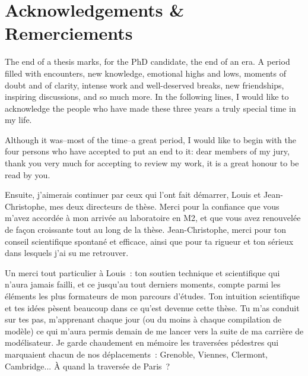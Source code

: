 \newpage
\thispagestyle{empty}
\mbox{}
\newpage


\chapter*{Acknowledgements \& Remerciements}
\label{chap:remerciements}
 {}

{\fontsize{11}{13}\selectfont
The end of a thesis marks, for the PhD candidate, the end of an era.
A period filled with encounters, new knowledge, emotional highs and lows, moments of doubt and of clarity, intense work and well-deserved breaks, new friendships, inspiring discussions, and so much more.
In the following lines, I would like to acknowledge the people who have made these three years a truly special time in my life.
\vspace{1em}

Although it was\---most of the time\---a great period, I would like to begin with the four persons who have accepted to put an end to it: dear members of my jury, thank you very much for accepting to review my work, it is a great honour to be read by you.
\vspace{1em}

Ensuite, j'aimerais continuer par ceux qui l'ont fait démarrer, Louis et Jean-Christophe, mes deux directeurs de thèse.
Merci pour la confiance que vous m'avez accordée à mon arrivée au laboratoire en M2, et que vous avez renouvelée de façon croissante tout au long de la thèse.
 Jean-Christophe, merci pour ton conseil scientifique spontané et efficace, ainsi que pour ta rigueur et ton sérieux dans lesquels j'ai su me retrouver. %

\noindent
Un merci tout particulier à Louis~: ton soutien technique et scientifique qui n'aura jamais failli, et ce jusqu'au tout derniers moments, compte parmi les éléments les plus formateurs de mon parcours d'études.
 Ton intuition scientifique et tes idées pèsent beaucoup dans ce qu'est devenue cette thèse.
 Tu m'as conduit sur tes pas, m'apprenant chaque jour (ou du moins à chaque compilation de modèle) ce qui m'aura permis demain de me lancer vers la suite de ma carrière de modélisateur.
Je garde chaudement en mémoire les traversées pédestres qui marquaient chacun de nos déplacements~: Grenoble, Viennes, Clermont, Cambridge... À quand la traversée de Paris~?
\vspace{1em}

}
